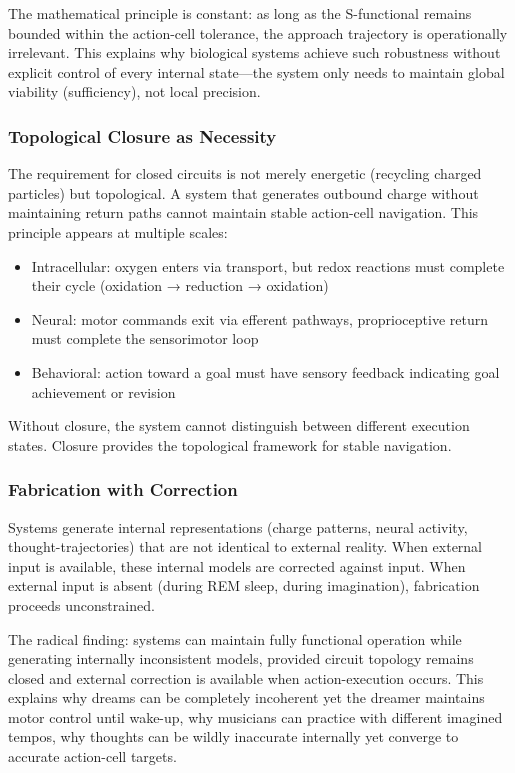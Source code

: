 \documentclass[twocolumn,11pt,a4paper]{article}
\begin{document}
The mathematical principle is constant: as long as the S-functional remains bounded within the action-cell tolerance, the approach trajectory is operationally irrelevant. This explains why biological systems achieve such robustness without explicit control of every internal state—the system only needs to maintain global viability (sufficiency), not local precision.

\subsubsection{Topological Closure as Necessity}

The requirement for closed circuits is not merely energetic (recycling charged particles) but topological. A system that generates outbound charge without maintaining return paths cannot maintain stable action-cell navigation. This principle appears at multiple scales:

\begin{itemize}
\item Intracellular: oxygen enters via transport, but redox reactions must complete their cycle (oxidation → reduction → oxidation)
\item Neural: motor commands exit via efferent pathways, proprioceptive return must complete the sensorimotor loop
\item Behavioral: action toward a goal must have sensory feedback indicating goal achievement or revision
\end{itemize}

Without closure, the system cannot distinguish between different execution states. Closure provides the topological framework for stable navigation.

\subsubsection{Fabrication with Correction}

Systems generate internal representations (charge patterns, neural activity, thought-trajectories) that are not identical to external reality. When external input is available, these internal models are corrected against input. When external input is absent (during REM sleep, during imagination), fabrication proceeds unconstrained.

The radical finding: systems can maintain fully functional operation while generating internally inconsistent models, provided circuit topology remains closed and external correction is available when action-execution occurs. This explains why dreams can be completely incoherent yet the dreamer maintains motor control until wake-up, why musicians can practice with different imagined tempos, why thoughts can be wildly inaccurate internally yet converge to accurate action-cell targets.
\end{document}
